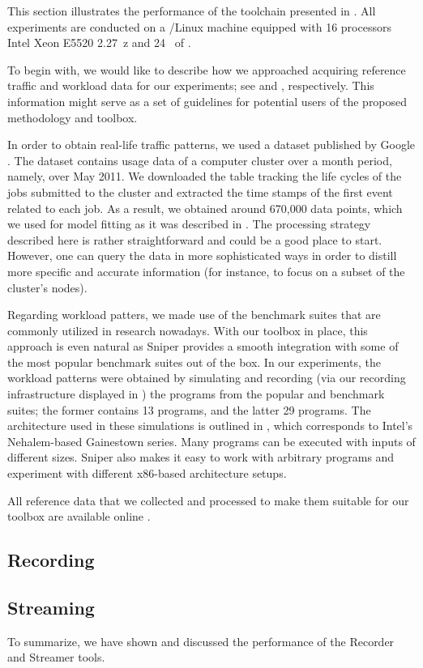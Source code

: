 This section illustrates the performance of the toolchain presented in
. All experiments are conducted on a /Linux machine
equipped with 16 processors Intel Xeon E5520 2.27~z and 24~ of
.

To begin with, we would like to describe how we approached acquiring reference
traffic and workload data for our experiments; see  and
, respectively. This information might serve as a set of
guidelines for potential users of the proposed methodology and toolbox.

In order to obtain real-life traffic patterns, we used a dataset published by
Google \cite{google}. The dataset contains usage data of a computer cluster over
a month period, namely, over May 2011. We downloaded the table tracking the life
cycles of the jobs submitted to the cluster and extracted the time stamps of the
first event related to each job. As a result, we obtained around 670,000 data
points, which we used for model fitting as it was described in .
The processing strategy described here is rather straightforward and could be a
good place to start. However, one can query the data in more sophisticated ways
in order to distill more specific and accurate information (for instance, to
focus on a subset of the cluster's nodes).


Regarding workload patters, we made use of the benchmark suites that are
commonly utilized in research nowadays. With our toolbox in place, this approach
is even natural as Sniper provides a smooth integration with some of the most
popular benchmark suites out of the box. In our experiments, the workload
patterns were obtained by simulating and recording (via our recording
infrastructure displayed in ) the programs from the popular
 \cite{bienia2011} and  \cite{cpu2006} benchmark
suites; the former contains 13 programs, and the latter 29 programs. The
architecture used in these simulations is outlined in , which
corresponds to Intel's Nehalem-based Gainestown series. Many programs can be
executed with inputs of different sizes. Sniper also makes it easy to work with
arbitrary programs and experiment with different x86-based architecture setups.

All reference data that we collected and processed to make them suitable for our
toolbox are available online \cite{sources}.

\subsection{Recording}


\subsection{Streaming}


To summarize, we have shown and discussed the performance of the Recorder and
Streamer tools.
